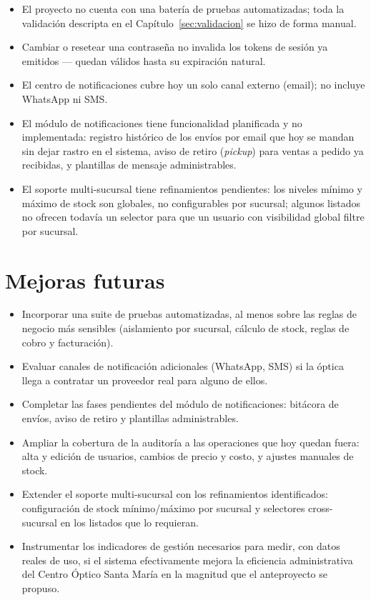 \begin{itemize}
  \item El proyecto no cuenta con una batería de pruebas automatizadas; toda la validación descripta en el Capítulo~\ref{sec:validacion} se hizo de forma manual.
  \item Cambiar o resetear una contraseña no invalida los tokens de sesión ya emitidos --- quedan válidos hasta su expiración natural.
  \item El centro de notificaciones cubre hoy un solo canal externo (email); no incluye WhatsApp ni SMS.
  \item El módulo de notificaciones tiene funcionalidad planificada y no implementada: registro histórico de los envíos por email que hoy se mandan sin dejar rastro en el sistema, aviso de retiro (\emph{pickup}) para ventas a pedido ya recibidas, y plantillas de mensaje administrables.
  \item El soporte multi-sucursal tiene refinamientos pendientes: los niveles mínimo y máximo de stock son globales, no configurables por sucursal; algunos listados no ofrecen todavía un selector para que un usuario con visibilidad global filtre por sucursal.
\end{itemize}

\section{Mejoras futuras}
\label{sec:conclusiones-mejoras}

\begin{itemize}
  \item Incorporar una suite de pruebas automatizadas, al menos sobre las reglas de negocio más sensibles (aislamiento por sucursal, cálculo de stock, reglas de cobro y facturación).
  \item Evaluar canales de notificación adicionales (WhatsApp, SMS) si la óptica llega a contratar un proveedor real para alguno de ellos.
  \item Completar las fases pendientes del módulo de notificaciones: bitácora de envíos, aviso de retiro y plantillas administrables.
  \item Ampliar la cobertura de la auditoría a las operaciones que hoy quedan fuera: alta y edición de usuarios, cambios de precio y costo, y ajustes manuales de stock.
  \item Extender el soporte multi-sucursal con los refinamientos identificados: configuración de stock mínimo/máximo por sucursal y selectores cross-sucursal en los listados que lo requieran.
  \item Instrumentar los indicadores de gestión necesarios para medir, con datos reales de uso, si el sistema efectivamente mejora la eficiencia administrativa del Centro Óptico Santa María en la magnitud que el anteproyecto se propuso.
\end{itemize}
